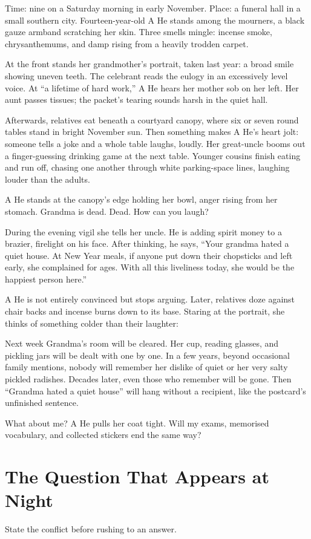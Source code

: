 Time: nine on a Saturday morning in early November. Place: a funeral hall in a small southern city. Fourteen-year-old A He stands among the mourners, a black gauze armband scratching her skin. Three smells mingle: incense smoke, chrysanthemums, and damp rising from a heavily trodden carpet.

At the front stands her grandmother's portrait, taken last year: a broad smile showing uneven teeth. The celebrant reads the eulogy in an excessively level voice. At ``a lifetime of hard work,'' A He hears her mother sob on her left. Her aunt passes tissues; the packet's tearing sounds harsh in the quiet hall.

Afterwards, relatives eat beneath a courtyard canopy, where six or seven round tables stand in bright November sun. Then something makes A He's heart jolt: someone tells a joke and a whole table laughs, loudly. Her great-uncle booms out a finger-guessing drinking game at the next table. Younger cousins finish eating and run off, chasing one another through white parking-space lines, laughing louder than the adults.

A He stands at the canopy's edge holding her bowl, anger rising from her stomach. Grandma is dead. Dead. How can you laugh?

During the evening vigil she tells her uncle. He is adding spirit money to a brazier, firelight on his face. After thinking, he says, ``Your grandma hated a quiet house. At New Year meals, if anyone put down their chopsticks and left early, she complained for ages. With all this liveliness today, she would be the happiest person here.''

A He is not entirely convinced but stops arguing. Later, relatives doze against chair backs and incense burns down to its base. Staring at the portrait, she thinks of something colder than their laughter:

Next week Grandma's room will be cleared. Her cup, reading glasses, and pickling jars will be dealt with one by one. In a few years, beyond occasional family mentions, nobody will remember her dislike of quiet or her very salty pickled radishes. Decades later, even those who remember will be gone. Then ``Grandma hated a quiet house'' will hang without a recipient, like the postcard's unfinished sentence.

What about me? A He pulls her coat tight. Will my exams, memorised vocabulary, and collected stickers end the same way?

\section{The Question That Appears at Night}
State the conflict before rushing to an answer.

